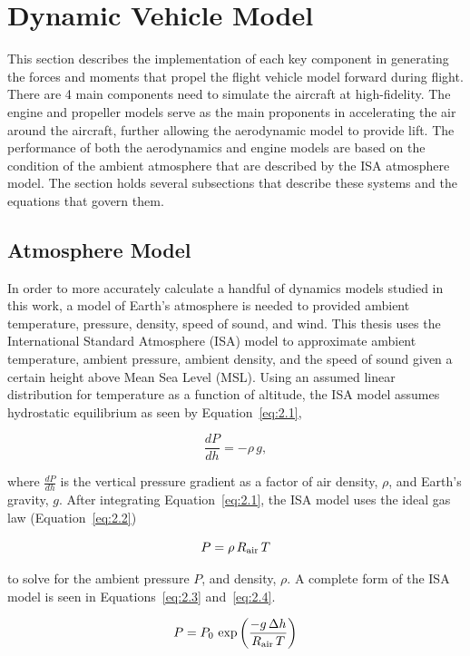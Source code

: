 \documentclass[12pt]{report}
\begin{document}
\section{Dynamic Vehicle Model}
This section describes the implementation of each key component in generating the forces and moments that propel the flight vehicle model forward during flight. There are 4 main components need to simulate the aircraft at high-fidelity. The engine and propeller models serve as the main proponents in accelerating the air around the aircraft, further allowing the aerodynamic model to provide lift. The performance of both the aerodynamics and engine models are based on the condition of the ambient atmosphere that are described by the ISA atmosphere model. The section holds several subsections that describe these systems and the equations that govern them.

\subsection{Atmosphere Model}\label{section:atmos}
In order to more accurately calculate a handful of dynamics models studied in this work, a model of Earth's atmosphere is needed to provided ambient temperature, pressure, density, speed of sound, and wind. This thesis uses the International Standard Atmosphere (ISA) model to approximate ambient temperature, ambient pressure, ambient density, and the speed of sound given a certain height above Mean Sea Level (MSL). Using an assumed linear distribution for temperature as a function of altitude, the ISA model assumes hydrostatic equilibrium as seen by Equation~\ref{eq:2.1},

\begin{equation}
  \frac{dP}{dh} = -\rho \, g,
  \label{eq:2.1}
\end{equation}

where \(\frac{dP}{dh}\) is the vertical pressure gradient as a factor of air density, \( \rho \), and Earth's gravity, \(g\). After integrating Equation~\ref{eq:2.1}, the ISA model uses the ideal gas law (Equation~\ref{eq:2.2})

\begin{equation}
  P = \rho \, R\textsubscript{air} \, T
  \label{eq:2.2}
\end{equation}

to solve for the ambient pressure \(P\), and density, \( \rho \). A complete form of the ISA model is seen in Equations~\ref{eq:2.3} and~\ref{eq:2.4}.

\begin{equation}
  P = P_0\,\exp\left({\frac{-g\,\Delta h}{R\textsubscript{air}\,T}}\right)
  \label{eq:2.3}
\end{equation}
\end{document}
